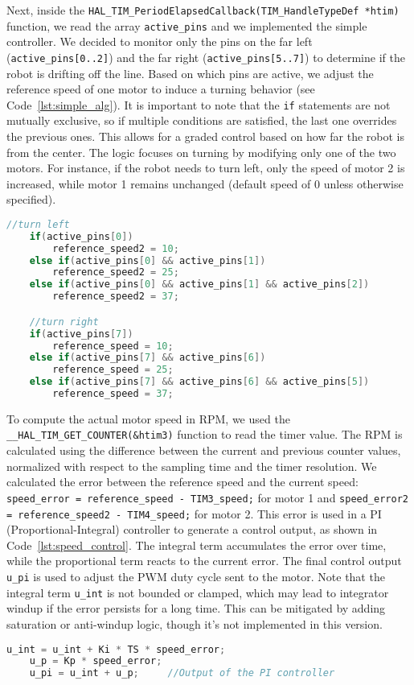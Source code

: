 Next, inside the \texttt{HAL\_TIM\_PeriodElapsedCallback(TIM\_HandleTypeDef *htim)} function, we read the array \texttt{active\_pins} and we implemented the simple controller.
We decided to monitor only the pins on the far left (\texttt{active\_pins[0..2]}) and the far right (\texttt{active\_pins[5..7]}) to determine if the robot is drifting off the line.
Based on which pins are active, we adjust the reference speed of one motor to induce a turning behavior (see Code~\ref{lst:simple_alg}).
It is important to note that the \texttt{if} statements are not mutually exclusive, so if multiple conditions are satisfied, the last one overrides the previous ones.
This allows for a graded control based on how far the robot is from the center.
The logic focuses on turning by modifying only one of the two motors. For instance, if the robot needs to turn left, only the speed of motor 2 is increased, while motor 1 remains unchanged (default speed of 0 unless otherwise specified).
\begin{lstlisting}[language=C, caption={Simple algorithm}, label={lst:simple_alg}]
    //turn left
	if(active_pins[0])
		reference_speed2 = 10;
	else if(active_pins[0] && active_pins[1])
		reference_speed2 = 25;
	else if(active_pins[0] && active_pins[1] && active_pins[2])
		reference_speed2 = 37;

	//turn right
	if(active_pins[7])
		reference_speed = 10;
	else if(active_pins[7] && active_pins[6])
		reference_speed = 25;
	else if(active_pins[7] && active_pins[6] && active_pins[5])
		reference_speed = 37;
\end{lstlisting}

To compute the actual motor speed in RPM, we used the \texttt{\_\_HAL\_TIM\_GET\_COUNTER(\&htim3)} function to read the timer value. 
The RPM is calculated using the difference between the current and previous counter values, normalized with respect to the sampling time and the timer resolution.
We calculated the error between the reference speed and the current speed: \texttt{speed\_error = reference\_speed - TIM3\_speed;} for motor 1 and \texttt{speed\_error2 = reference\_speed2 - TIM4\_speed;} for motor 2. 
 This error is used in a PI (Proportional-Integral) controller to generate a control output, as shown in Code~\ref{lst:speed_control}.
The integral term accumulates the error over time, while the proportional term reacts to the current error. The final control output \texttt{u\_pi} is used to adjust the PWM duty cycle sent to the motor.
Note that the integral term \texttt{u\_int} is not bounded or clamped, which may lead to integrator windup if the error persists for a long time. This can be mitigated by adding saturation or anti-windup logic, though it's not implemented in this version.
\begin{lstlisting}[language=C, caption={Speed control}, label={lst:speed_control}]
    u_int = u_int + Ki * TS * speed_error;
    u_p = Kp * speed_error; 
    u_pi = u_int + u_p;     //Output of the PI controller
\end{lstlisting}

